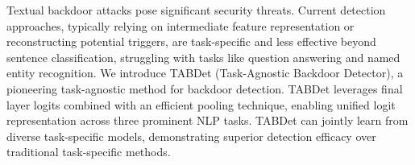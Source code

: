 Textual backdoor attacks pose significant security threats. Current detection approaches, typically relying on intermediate feature representation or reconstructing potential triggers, are task-specific and less effective beyond sentence classification, struggling with tasks like question answering and named entity recognition. We introduce TABDet (Task-Agnostic Backdoor Detector), a pioneering task-agnostic method for backdoor detection. TABDet leverages final layer logits combined with an efficient pooling technique, enabling unified logit representation across three prominent NLP tasks. TABDet can jointly learn from diverse task-specific models, demonstrating superior detection efficacy over traditional task-specific methods.